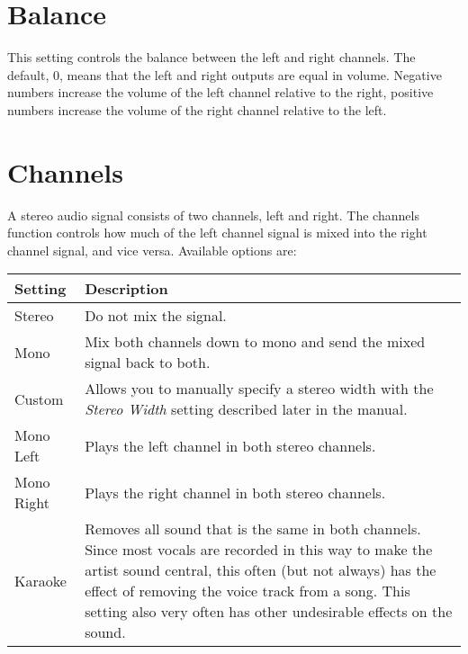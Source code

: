 \section{Balance}
  This setting controls the balance between the left and right channels.  The 
  default, 0, means that the left and right outputs are equal in volume.  
  Negative numbers increase the volume of the left channel relative to the
  right, positive numbers increase the volume of the right channel relative
  to the left.

\section{Channels}
  A stereo audio signal consists of two channels, left and right. The channels
   function controls how much of the left channel signal is mixed into the
   right channel signal, and vice versa.
  Available options are:
  \begin{table}
  \begin{center}
  \begin{tabularx}{\textwidth}{lX}\toprule
      \textbf{Setting} & \textbf{Description} \\\midrule
        Stereo
        & Do not mix the signal. \\
        Mono 
        & Mix both channels down to mono and send the mixed signal back to
          both. \\
        Custom
        & Allows you to manually specify a stereo width with the
          \emph{Stereo Width} setting described later in the manual. \\
        Mono Left
        & Plays the left channel in both stereo channels. \\
        Mono Right
        & Plays the right channel in both stereo channels. \\
        Karaoke
        & Removes all sound that is the same in both channels. Since most
          vocals are recorded in this way to make the artist sound central,
          this often (but not always) has the effect of removing the voice
          track from a song. This setting also very often has other undesirable
          effects on the sound.  \\
        \bottomrule
  \end{tabularx}
  \end{center}
  \end{table}
      
